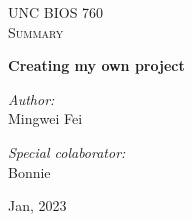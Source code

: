 \begin{titlepage}
\vbox{ }

\vbox{ }

\begin{center}
\textsc{\LARGE UNC BIOS 760}\\[1.5cm]
\textsc{\Large Summary}\\[0.5cm]

\vbox{ }

{ \huge \bfseries Creating my own project}\\[0.4cm]

\begin{minipage}{0.4\textwidth}
\begin{flushleft} \large
\emph{Author:}\\
Mingwei Fei
\end{flushleft}
\end{minipage}
\begin{minipage}{0.4\textwidth}
\begin{flushright} \large
\emph{Special colaborator:} \\
Bonnie
\end{flushright}
\end{minipage}
\vfill
{\large Jan, 2023}
\end{center}
\end{titlepage}